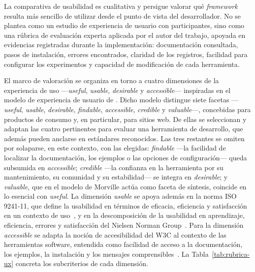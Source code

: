 La comparativa de usabilidad es cualitativa y persigue valorar qué \textit{framework} resulta más
sencillo de utilizar desde el punto de vista del desarrollador. No se plantea como un estudio de
experiencia de usuario con participantes, sino como una rúbrica de evaluación experta aplicada por
el autor del trabajo, apoyada en evidencias registradas durante la implementación: documentación
consultada, pasos de instalación, errores encontrados, claridad de los registros, facilidad para
configurar los experimentos y capacidad de modificación de cada herramienta.

El marco de valoración se organiza en torno a cuatro dimensiones de la experiencia de uso
—\textit{useful}, \textit{usable}, \textit{desirable} y \textit{accessible}— inspiradas en el
modelo de experiencia de usuario de \textcite{morville2004ux}. Dicho modelo distingue siete
facetas —\textit{useful}, \textit{usable}, \textit{desirable}, \textit{findable},
\textit{accessible}, \textit{credible} y \textit{valuable}—, concebidas para productos de
consumo y, en particular, para sitios web. De ellas se seleccionan y adaptan las cuatro
pertinentes para evaluar una herramienta de desarrollo, que además pueden anclarse en
estándares reconocidos. Las tres restantes se omiten por solaparse, en este contexto, con
las elegidas: \textit{findable} —la facilidad de localizar la documentación, los ejemplos o
las opciones de configuración— queda subsumida en \textit{accessible}; \textit{credible} —la
confianza en la herramienta por su mantenimiento, su comunidad y su estabilidad— se integra
en \textit{desirable}; y \textit{valuable}, que en el modelo de Morville actúa como faceta de
síntesis, coincide en lo esencial con \textit{useful}. La dimensión
\textit{usable} se apoya además en la norma ISO 9241-11, que define la usabilidad en términos de
eficacia, eficiencia y satisfacción en un contexto de uso~\parencite{iso924111}, y en la
descomposición de la usabilidad en aprendizaje, eficiencia, errores y satisfacción del Nielsen
Norman Group~\parencite{nielsen1994usability}. Para la dimensión \textit{accessible} se adapta la
noción de accesibilidad del W3C al contexto de las herramientas software, entendida como facilidad
de acceso a la documentación, los ejemplos, la instalación y los mensajes
comprensibles~\parencite{w3cwcag}. La Tabla~\ref{tab:rubrica-ux} concreta los subcriterios de cada
dimensión.

